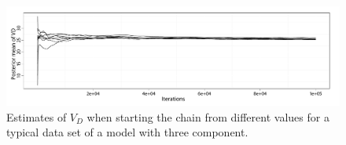 \begin{figure}[t]
  \UseAltLinespread
  \includegraphics[width=\linewidth]{fig_src/PET_VD}
  \caption[Convergence diagnostics for the random walk algorithm for the
  \protect\pet compartmental model using averages]
  {Estimates of $V_D$ when starting the \mcmc chain from different
    values for a typical data set of a \pet model with three component.}
  \label{fig:pet vd mean}
\end{figure}
